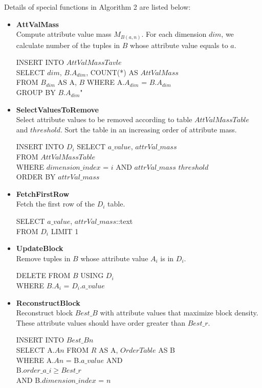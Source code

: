 Details of special functions in Algorithm 2 are listed below:
\begin{itemize}
    \item \textbf{AttValMass}    \\
    Compute attribute value mass $M_{B(a,n)}$. For each dimension $dim$, we calculate number of the tuples in $B$ whose attribute value equals to $a$.
    \begin{algorithmic}
    \STATE INSERT INTO $AttValMassTavle$ \\
        SELECT $dim$, $B$.$A_{dim}$, COUNT(*) AS $AttValMass$ \\ 
        FROM $B_{dim}$ AS A, $B$ WHERE A.$A_{dim}$ = $B$.$A_{dim}$ \\
        GROUP BY $B$.$A_{dim}$"
    \end{algorithmic}
    \item \textbf{SelectValuesToRemove} \\
    Select attribute values to be removed according to table $AttValMassTable$ and $threshold$. Sort the table in an increasing order of attribute mass.
    \begin{algorithmic}
    \STATE  INSERT INTO $D_i$ SELECT $a\_value$, $attrVal\_mass$ \\
    FROM $AttValMassTable$  \\
    WHERE $dimension\_index$ = $i$ AND {$attrVal\_mass$ \leq $threshold$} \\
    ORDER BY $attrVal\_mass$
    \end{algorithmic}
    \item \textbf{FetchFirstRow} \\
    Fetch the first row of the $D_i$ table.
    \begin{algorithmic}
    \STATE SELECT $a\_value$, $attrVal\_mass$::text \\
    FROM $D_i$ LIMIT 1
    \end{algorithmic}
    \item \textbf{UpdateBlock} \\
    Remove tuples in $B$ whose attribute value $A_i$ is in $D_i$.
    \begin{algorithmic}
    \STATE DELETE FROM $B$ USING $D_i$ \\
    WHERE $B$.$A_i$ = $D_i$.$a\_value$
    \end{algorithmic}
    \item \textbf{ReconstructBlock} \\
    Reconstruct block $Best\_B$ with attribute values that maximize block density. These attribute values should have order greater than $Best\_r$.
    \begin{algorithmic}
    \STATE INSERT INTO $Best\_Bn$ \\
        SELECT A.$An$ FROM $R$ AS A, $OrderTable$ AS B\\ 
        WHERE A.$An$ = B.$a\_value$ AND \\
        B.${{order\_a\_i} \geq {Best\_r}}$ \\
        AND B.$dimension\_index$ = $n$
    \end{algorithmic}
\end{itemize}

